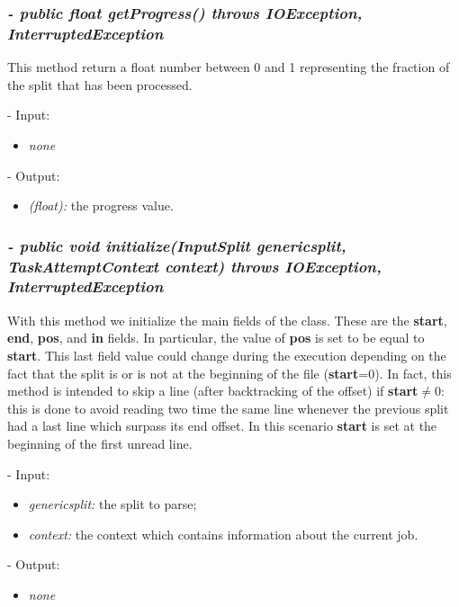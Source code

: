 \documentclass[]{report}
\begin{document}
	\subsubsection*{\textit{\textbf{-} public float getProgress() throws IOException, InterruptedException}}   	
	This method return a float number between 0 and 1 representing the fraction of the split that has been processed. 
	\begin{description}
		\item - Input:
		\begin{itemize}
			\item \textit{none}
		\end{itemize}
	\end{description}	
	\begin{description}
		\item - Output:
		\begin{itemize}
			\item \textit{(float):} the progress value. 
		\end{itemize}
	\end{description}

	\subsubsection*{\textit{\textbf{-} public void initialize(InputSplit genericsplit, TaskAttemptContext context) throws IOException, InterruptedException}}   	
	With this method we initialize the main fields of the class. These are the \textbf{start}, \textbf{end}, \textbf{pos}, and \textbf{in} fields. In particular, the value of \textbf{pos} is set to be equal to \textbf{start}. This last field value could change during the execution depending on the fact that the split is or is not at the beginning of the file (\textbf{start}=0). In fact, this method is intended to skip a line (after backtracking of the offset) if \textbf{start}$\neq$0: this is done to avoid reading two time the same line whenever the previous split had a last line which surpass its end offset. In this scenario \textbf{start} is set at the beginning of the first unread line.   
	\begin{description}
		\item - Input:
		\begin{itemize}
			\item \textit{genericsplit:} the split to parse;
			\item \textit{context:} the context which contains information about the current job.
		\end{itemize}
	\end{description}	
	\begin{description}
		\item - Output:
		\begin{itemize}
			\item \textit{none}  
		\end{itemize}
	\end{description}
\end{document}
